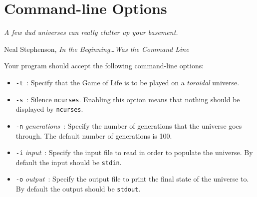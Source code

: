 \section{Command-line Options}

\textwidth
\epigraph{\emph{A few dud universes can really clutter up your basement.}}{Neal
Stephenson, \emph{In the Beginning\ldots Was the Command Line}}

Your program should accept the following command-line options:

\begin{itemize}
  \item \texttt{-t}\ : Specify that the Game of Life is to be played on a \emph{toroidal}
    universe.
  \item \texttt{-s}\ : Silence \texttt{ncurses}. Enabling this option means
    that nothing should be displayed by \texttt{ncurses}.
  \item \texttt{-n} \emph{generations}\ : Specify the number of generations that the
    universe goes through. The default number of generations is 100.
  \item \texttt{-i} \emph{input}\ : Specify the input file to read in order to populate
    the universe. By default the input should be \texttt{stdin}.
  \item \texttt{-o} \emph{output}\ : Specify the output file to print the final state
    of the universe to. By default the output should be \texttt{stdout}.
\end{itemize}
